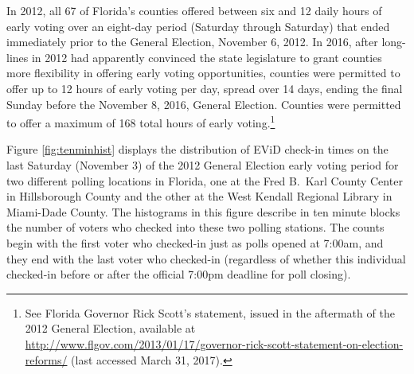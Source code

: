 \documentclass[12pt,titlepage]{article}
\begin{document}



In 2012, all 67 of Florida's counties offered between six and 12 daily
hours of early voting over an eight-day period (Saturday through
Saturday) that ended immediately prior to the General Election,
November 6, 2012.  In 2016, after long-lines in 2012 had apparently
convinced the state legislature to grant counties more flexibility in
offering early voting opportunities, counties were permitted to offer
up to 12 hours of early voting per day, spread over 14 days, ending
the final Sunday before the November 8, 2016, General Election.
Counties were permitted to offer a maximum of 168 total hours of early
voting.\footnote{See Florida Governor Rick Scott's statement, issued
  in the aftermath of the 2012 General Election, available at
  \url{http://www.flgov.com/2013/01/17/governor-rick-scott-statement-on-election-reforms/}
  (last accessed March 31, 2017).}


Figure \ref{fig:tenminhist} displays the distribution of EViD check-in
times on the last Saturday (November 3) of the 2012 General Election
early voting period for two different polling locations in Florida,
one at the Fred B.\ Karl County Center in Hillsborough County and the
other at the West Kendall Regional Library in Miami-Dade County.  The
histograms in this figure describe in ten minute blocks the number of
voters who checked into these two polling stations.  The counts begin
with the first voter who checked-in just as polls opened at 7:00am,
and they end with the last voter who checked-in (regardless of whether
this individual checked-in before or after the official 7:00pm
deadline for poll closing).
\end{document}
